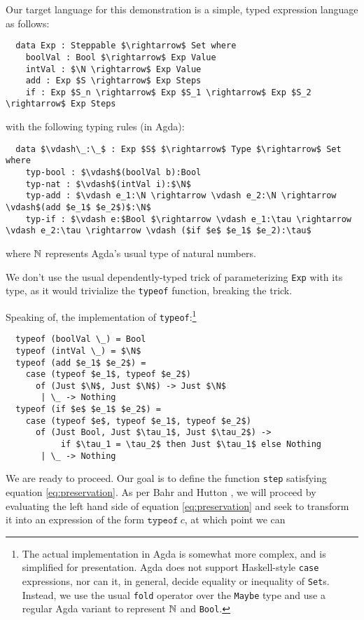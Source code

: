 \documentclass[manuscript,screen,review,sigplan]{acmart}
\begin{document}
Our target language for this demonstration is a simple, typed expression
language as follows:

\begin{lstlisting}
  data Exp : Steppable $\rightarrow$ Set where
    boolVal : Bool $\rightarrow$ Exp Value
    intVal : $\N \rightarrow$ Exp Value
    add : Exp $S \rightarrow$ Exp Steps
    if : Exp $S_n \rightarrow$ Exp $S_1 \rightarrow$ Exp $S_2 \rightarrow$ Exp Steps
\end{lstlisting}

with the following typing rules (in Agda):

\begin{lstlisting}
  data $\vdash\_:\_$ : Exp $S$ $\rightarrow$ Type $\rightarrow$ Set where
    typ-bool : $\vdash$(boolVal b):Bool
    typ-nat : $\vdash$(intVal i):$\N$
    typ-add : $\vdash e_1:\N \rightarrow \vdash e_2:\N \rightarrow \vdash$(add $e_1$ $e_2$)$:\N$
    typ-if : $\vdash e:$Bool $\rightarrow \vdash e_1:\tau \rightarrow \vdash e_2:\tau \rightarrow \vdash ($if $e$ $e_1$ $e_2):\tau$
\end{lstlisting}

where $\mathbb{N}$ represents Agda's usual type of natural numbers.

We don't use the usual dependently-typed trick of parameterizing
\texttt{Exp} with its type, as it would trivialize the \texttt{typeof}
function, breaking the trick.

Speaking of, the implementation of \texttt{typeof}:\footnote{The actual
implementation in Agda is somewhat more complex, and is simplified for
presentation. Agda does not support Haskell-style \texttt{case} expressions,
nor can it, in general, decide equality or inequality of \texttt{Set}s.
Instead, we use the usual \texttt{fold} operator over the \texttt{Maybe}
type and use a regular Agda variant to represent $\mathbb{N}$ and \texttt{Bool}.}

\begin{lstlisting}
  typeof (boolVal \_) = Bool
  typeof (intVal \_) = $\N$
  typeof (add $e_1$ $e_2$) =
    case (typeof $e_1$, typeof $e_2$)
      of (Just $\N$, Just $\N$) -> Just $\N$
       | \_ -> Nothing
  typeof (if $e$ $e_1$ $e_2$) =
    case (typeof $e$, typeof $e_1$, typeof $e_2$)
      of (Just Bool, Just $\tau_1$, Just $\tau_2$) ->
           if $\tau_1 = \tau_2$ then Just $\tau_1$ else Nothing
       | \_ -> Nothing
\end{lstlisting}

We are ready to proceed. Our goal is to define the function \texttt{step}
satisfying equation \ref{eq:preservation}. As per Bahr and Hutton
\cite{bahr:2015}, we will proceed by evaluating the left hand side of equation
\ref{eq:preservation} and seek to transform it into an expression of the form
$\texttt{typeof}\ c$, at which point we can



\end{document}
